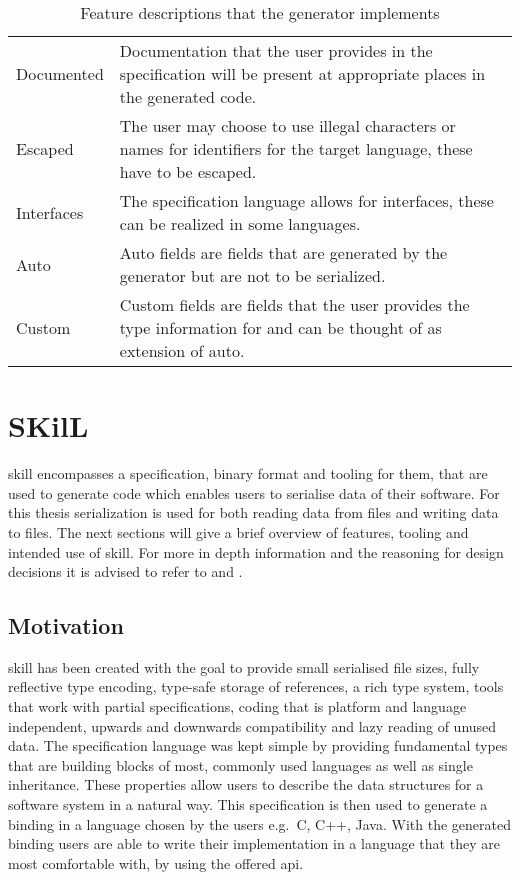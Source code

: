 \documentclass[thesis]{subfiles}
\begin{document}
  \begin{table}
    \begin{tabu}to\linewidth{lX}
      Documented
       & Documentation that the user provides in the specification will be present at appropriate places in the generated code.\autocite{skill-tr}    \\
      Escaped
       & The user may choose to use illegal characters or names for identifiers for the target language, these have to be escaped.\autocite{skill-tr} \\
      Interfaces
       & The specification language allows for interfaces, these can be realized in some languages.\autocite{skill-tr}                                \\
      Auto
       & Auto fields are fields that are generated by the generator but are not to be serialized.\autocite{skill-tr}                                  \\
      Custom
       & Custom fields are fields that the user provides the type information for and can be thought of as extension of auto.\autocite{skill-tr}      \\
    \end{tabu}
    \caption{Feature descriptions that the generator implements}\label{tab:feat}
  \end{table}

\section{SKilL}\label{sec:skill}
  \gls{skill} encompasses a specification, binary format and tooling for them, that are used to generate code which enables users to serialise data of their software.
  For this thesis serialization is used for both reading data from files and writing data to files.
  The next sections will give a brief overview of features, tooling and intended use of \gls{skill}.
  For more in depth information and the reasoning for design decisions it is advised to refer to \autocite{skill-tr} and \autocite{skill-dis}.

  \subsection{Motivation}
    \gls{skill} has been created with the goal to provide small serialised file sizes, fully reflective type encoding, type-safe storage of references, a rich type system, tools that work with partial specifications,
    coding that is platform and language independent, upwards and downwards compatibility and lazy reading of unused data.
    The specification language was kept simple by providing fundamental types that are building blocks of most, commonly used languages as well as single inheritance.
    These properties allow users to describe the data structures for a software system in a natural way.
    This specification is then used to generate a binding in a language chosen by the users e.g.~C, C++, Java.
    With the generated binding users are able to write their implementation in a language that they are most comfortable with, by using the offered \gls{api}.
    \autocite{skill-tr}
\end{document}
